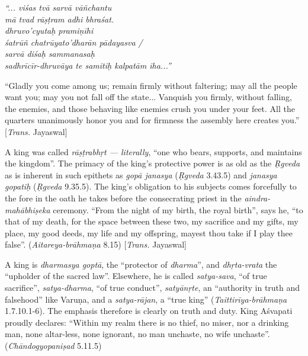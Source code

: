 \begin{myquote}
{{\sl “... viśas tvā sarvā vāñchantu}}\\
{{\sl mā tvad rāṣṭram adhi bhraśat.}}\\
{{\sl dhruvo’cyutaḥ pramiṇīhi}}\\
{{\sl śatrūñ chatrūyato’dharān pādayasva /}}\\
{{\sl sarvā diśaḥ sammanasaḥ}}\\
{{\sl sadhrīcīr-dhruvāya te samitiḥ kalpatām iha...”}}
\end{myquote}

“Gladly you come among us; remain firmly without faltering; may all the people want you; may you not fall off the state... Vanquish you firmly, without falling, the enemies, and those behaving like enemies crush you under your feet. All the quarters unanimously honor you and for firmness the assembly here creates you.” [{\sl Trans.} Jayaswal]

A king was called {\sl rāṣṭrabhṛt --- literally}, “one who bears, supports, and maintains the kingdom”.  The primacy of the king’s protective power is as old as the {\sl Ṛgveda} as is inherent in such epithets as {\sl gopā janasya} ({\sl Ṛgveda} 3.43.5) and {\sl janasya gopatiḥ} ({\sl Ṛgveda} 9.35.5). The king’s obligation to his subjects comes forcefully to the fore in the oath he takes before the consecrating priest in the {\sl aindra-mahābhiṣeka} ceremony. “From the night of my birth, the royal birth”, says he, “to that of my death, for the space between these two, my sacrifice and my gifts, my place, my good deeds, my life and my offspring, mayest thou take if I play thee false”. ({\sl Aitareya-brāhmaṇa} 8.15) [{\sl Trans.} Jayaswal]

A king is {\sl dharmasya goptā}, the “protector of {\sl dharma}”, and {\sl dhṛta-vrata} the “upholder of the sacred law”. Elsewhere, he is called {\sl satya-sava}, “of true sacrifice”, {\sl satya-dharma}, “of true conduct”, {\sl satyānṛte}, an “authority in truth and falsehood” like Varuṇa, and a {\sl satya-rājan}, a “true king” ({\sl Taittirīya-brāhmaṇa} 1.7.10.1-6). The emphasis therefore is clearly on truth and duty. King Aśvapati proudly declares: “Within my realm there is no thief, no miser, nor a drinking man, none altar-less, none ignorant, no man unchaste, no wife unchaste”. ({\sl Chāndogyopaniṣad} 5.11.5) 

